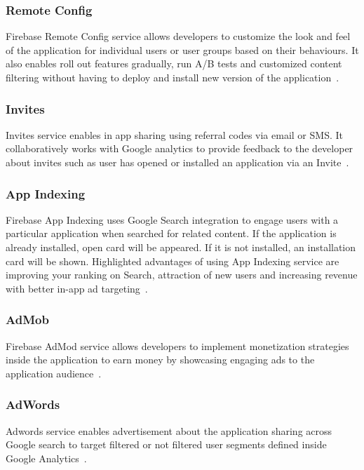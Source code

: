 \subsubsection{Remote Config}
Firebase Remote Config service allows developers to customize the look and feel 
of the application for individual users or user groups based on their 
behaviours. It also enables roll out features gradually, run A/B tests and 
customized content filtering without having to deploy and install new version 
of the application~\cite{hid-sp18-409-www-firebase-products}.

\subsubsection{Invites}
Invites service enables in app sharing using referral codes via email or SMS. 
It collaboratively works with Google analytics to provide feedback to the 
developer about invites such as user has opened or installed an application via 
an Invite~\cite{hid-sp18-409-www-firebase-products, 
	hid-sp18-409-www-firebase-invite}.

\subsubsection{App Indexing}
Firebase App Indexing uses Google Search integration to engage users with a 
particular application when searched for related content. If the application is 
already installed, open card will be appeared. If it is not installed, an 
installation card will be shown. Highlighted advantages of using App Indexing 
service are improving your ranking on Search, attraction of new users and 
increasing revenue with better in-app ad 
targeting~\cite{hid-sp18-409-www-firebase-products}.

\subsubsection{AdMob}
Firebase AdMod service allows developers to implement monetization strategies 
inside the application to earn money by showcasing engaging ads to the 
application audience~\cite{hid-sp18-409-www-firebase-admob}.

\subsubsection{AdWords}
Adwords service enables advertisement about the application  sharing across 
Google search to target filtered or not filtered user segments defined inside 
Google Analytics~\cite{hid-sp18-409-www-firebase-adwords}.

